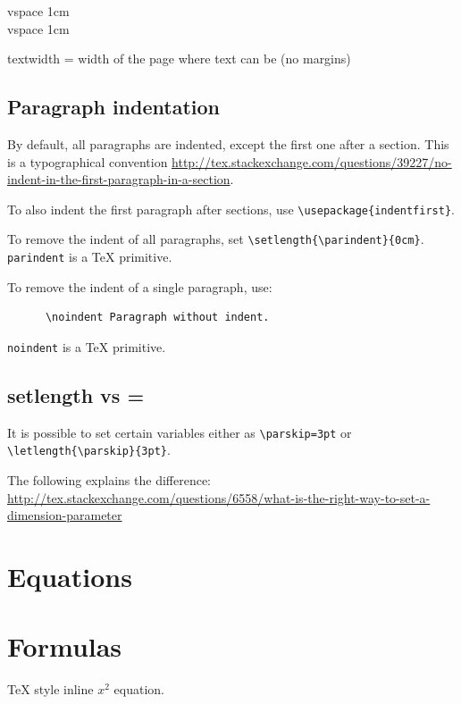 \documentclass[12pt]{article}
\begin{document}
    vspace 1cm \\[1cm]

    vspace 1cm

  textwidth = width of the page where text can be (no margins)

  \subsection{Paragraph indentation}\label{paragraph-indentation}

    By default, all paragraphs are indented, except the first one after a section. This is a typographical convention \url{http://tex.stackexchange.com/questions/39227/no-indent-in-the-first-paragraph-in-a-section}.

    To also indent the first paragraph after sections, use \lstinline|\usepackage{indentfirst}|.

    To remove the indent of all paragraphs, set \lstinline|\setlength{\parindent}{0cm}|. \lstinline|parindent| is a TeX primitive.

    To remove the indent of a single paragraph, use:

    \begin{lstlisting}
      \noindent Paragraph without indent.
    \end{lstlisting}

    \lstinline|noindent| is a TeX primitive.

  \subsection{setlength vs =}\label{setlength-vs-eq}

    It is possible to set certain variables either as \lstinline|\parskip=3pt| or \lstinline|\letlength{\parskip}{3pt}|.

    The following explains the difference: \url{http://tex.stackexchange.com/questions/6558/what-is-the-right-way-to-set-a-dimension-parameter}

\section{Equations}\label{equations}

\section{Formulas}\label{formulas}

  TeX style inline $x^2$ equation.
\end{document}
